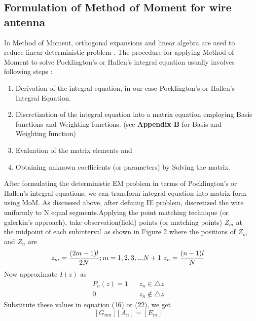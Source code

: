 \documentclass[aps,prstab,twocolumn,superscriptaddress,groupedaddress,showkeys,nofootinbib]{revtex4}  %
\begin{document}
\subsection{Formulation of Method of Moment for wire antenna }
In Method of Moment, orthogonal expansions and linear algebra are used to reduce linear deterministic problem \cite{paper1}. The procedure for applying Method of Moment to solve Pocklington's or Hallen's integral equation usually involves following steps \cite{sadiku}:
\begin{enumerate}
\item Derivation of the integral equation, in our case Pocklington's or Hallen's Integral Equation.
\item Discretization of the integral equation into a matrix equation employing Basis functions and Weighting functions. (see \textbf{Appendix B} for Basis and Weighting function)
\item Evaluation of the matrix elements and
\item Obtaining unknown coefficients (or parameters) by  Solving the matrix.
\end{enumerate}
After formulating the deterministic EM problem in terms of Pocklington's or Hallen's integral equations, we can transform integral equation into matrix form using MoM. As discussed above, after defining IE problem, discretized the wire uniformly to N equal segments.Applying the point matching technique (or galerkin's approach), take observation(field) points (or matching points) $Z_{m}$ at the midpoint of each subinterval as shown in Figure 2 where the positions of $Z_{m}$ and $Z_{n}$ are 
\begin{equation}
z_{m}=\frac{(2m-1)l}{2N}; m=1,2,3,...N+1 \\ 
\ z_{n}=\frac{(n-1)l}{N}
\end{equation}
Now approximate $I(z)$ as 
\begin{eqnarray}
P_{n}(z)= 1 &&  z_{n} \in \triangle z \\ \nonumber 
0 && z_{n} \notin \triangle z 
\end{eqnarray}
Substitute these values in equation (16) or (22), we get 
\begin{equation}
\left [ G_{mn} \right ]\left [A_{n}  \right ]=\left [ E_{m} \right ]
\end{equation}
\end{document}
